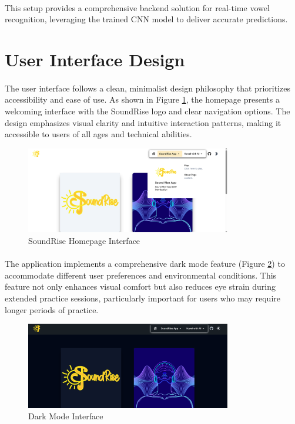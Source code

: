 \paragraph{}
This setup provides a comprehensive backend solution for real-time vowel recognition, leveraging the trained CNN model to deliver accurate predictions.

\section{User Interface Design}
\label{sec:interface-design}

\paragraph{}
The user interface follows a clean, minimalist design philosophy that prioritizes accessibility and ease of use. As shown in Figure \ref{fig:homepage}, the homepage presents a welcoming interface with the SoundRise logo and clear navigation options. The design emphasizes visual clarity and intuitive interaction patterns, making it accessible to users of all ages and technical abilities.

\begin{figure}[htbp]
    \centering
    \includegraphics[width=0.8\textwidth]{res/images/webapp/homepage-1.png}
    \caption{SoundRise Homepage Interface}
    \label{fig:homepage}
\end{figure}

\paragraph{}
The application implements a comprehensive dark mode feature (Figure \ref{fig:dark_mode}) to accommodate different user preferences and environmental conditions. This feature not only enhances visual comfort but also reduces eye strain during extended practice sessions, particularly important for users who may require longer periods of practice.

\begin{figure}[htbp]
    \centering
    \includegraphics[width=0.8\textwidth]{res/images/webapp/homepage-darkMode.png}
    \caption{Dark Mode Interface}
    \label{fig:dark_mode}
\end{figure}

